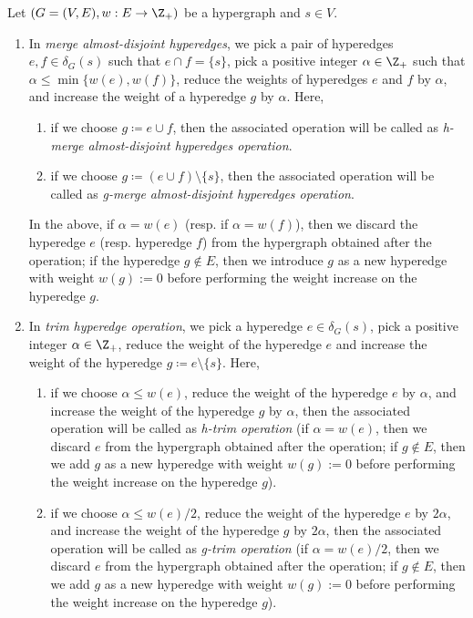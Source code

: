 \begin{definition}\label{defn:splitting-off}
    Let $(G=(V, E), w: E\rightarrow \Z_+)$ be a hypergraph and $s\in V$. 
    \begin{enumerate}
            
        \item 
        In \emph{merge almost-disjoint hyperedges}, we pick a pair of hyperedges $e, f\in \delta_G(s)$ such that $e\cap f=\{s\}$, pick a positive integer $\alpha \in \Z_+$ such that $\alpha\le \min\{w(e), w(f)\}$, reduce the weights of hyperedges $e$ and $f$ by $\alpha$, and increase the weight of a hyperedge $g$ by $\alpha$. Here, 
        \begin{enumerate}
            \item if we choose $g\coloneqq e \cup f$, then the associated operation will be called as \emph{h-merge almost-disjoint hyperedges operation}.
            \item if we choose $g\coloneqq (e\cup f)\setminus \{s\}$, then the associated operation will be called as \emph{g-merge almost-disjoint hyperedges operation}.
        \end{enumerate}
        In the above, if $\alpha=w(e)$ (resp. if $\alpha = w(f)$), then we discard the hyperedge $e$ (resp. hyperedge $f$) from the hypergraph obtained after the operation; if the hyperedge $g\not\in E$, then we introduce $g$ as a new hyperedge with weight $w(g) := 0$ before performing the weight increase on the hyperedge $g$.
    
        \item 
        In \emph{trim hyperedge operation}, we pick a hyperedge $e\in \delta_G(s)$, pick a positive integer $\alpha \in \Z_+$,
        reduce the weight of the hyperedge $e$ and 
        increase the weight of the hyperedge $g\coloneqq e\setminus \{s\}$. Here, 
        \begin{enumerate}
            \item if we choose $\alpha \le w(e)$, reduce the weight of the hyperedge $e$ by $\alpha$,  and increase the weight of the hyperedge $g$ by $\alpha$, then the associated operation will be called as \emph{h-trim operation} (if $\alpha=w(e)$, then we discard $e$ from the hypergraph obtained after the operation; if $g\not\in E$, then we add $g$ as a new hyperedge with weight $w(g) := 0$ before performing the weight increase on the hyperedge $g$). 
            
            \item if we choose $\alpha \le w(e)/2$, reduce the weight of the hyperedge $e$ by $2\alpha$, and increase the weight of the hyperedge $g$ by $2\alpha$, then the associated operation will be called as \emph{g-trim operation} (if $\alpha=w(e)/2$, then we discard $e$ from the hypergraph obtained after the operation; if $g\not\in E$, then we add $g$ as a new hyperedge with weight $w(g) := 0$ before performing the weight increase on the hyperedge $g$).  
        \end{enumerate}


\end{enumerate}
\end{definition}
